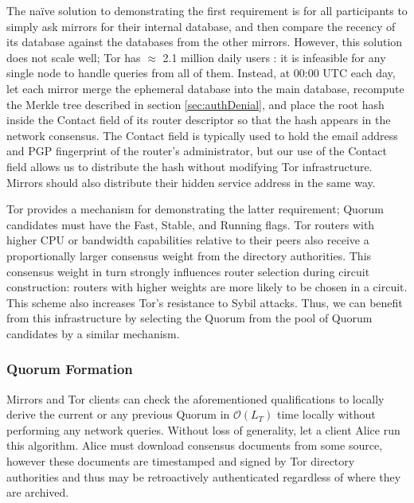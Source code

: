 \documentclass[USenglish,oneside,twocolumn]{article}
\begin{document}
The na\"{i}ve solution to demonstrating the first requirement is for all participants to simply ask mirrors for their internal database, and then compare the recency of its database against the databases from the other mirrors. However, this solution does not scale well; Tor has $ \approx $ 2.1 million daily users \cite{TorMetrics}: it is infeasible for any single node to handle queries from all of them. Instead, at 00:00 UTC each day, let each mirror merge the ephemeral database into the main database, recompute the Merkle tree described in section \ref{sec:authDenial}, and place the root hash inside the Contact field of its router descriptor so that the hash appears in the network consensus. The Contact field is typically used to hold the email address and PGP fingerprint of the router's administrator, but our use of the Contact field allows us to distribute the hash without modifying Tor infrastructure. Mirrors should also distribute their hidden service address in the same way. %

Tor provides a mechanism for demonstrating the latter requirement; Quorum candidates must have the Fast, Stable, and Running flags. Tor routers with higher CPU or bandwidth capabilities relative to their peers also receive a proportionally larger consensus weight from the directory authorities. This consensus weight in turn strongly influences router selection during circuit construction: routers with higher weights are more likely to be chosen in a circuit. This scheme also increases Tor's resistance to Sybil attacks. Thus, we can benefit from this infrastructure by selecting the Quorum from the pool of Quorum candidates by a similar mechanism.

\subsubsection{Quorum Formation} %
\label{sec:qFormation}

Mirrors and Tor clients can check the aforementioned qualifications to locally derive the current or any previous Quorum in $ \mathcal{O}(L_{T}) $ time locally without performing any network queries. Without loss of generality, let a client Alice run this algorithm. Alice must download consensus documents from some source, however these documents are timestamped and signed by Tor directory authorities and thus may be retroactively authenticated regardless of where they are archived.
\end{document}
